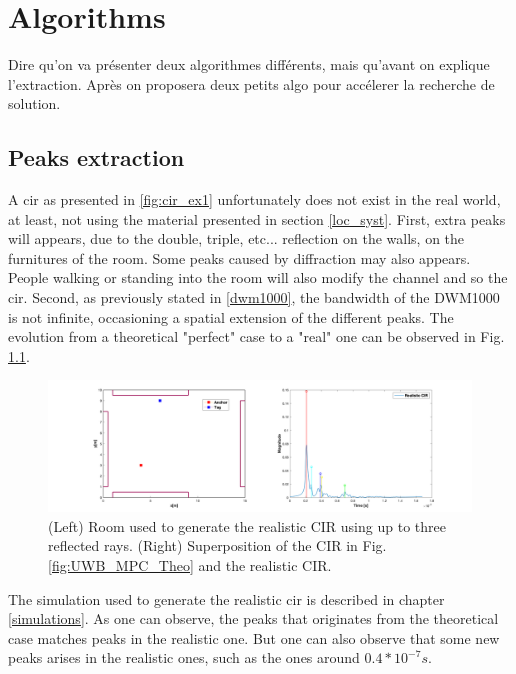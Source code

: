 \chapter{Algorithms}

Dire qu'on va présenter deux algorithmes différents, mais qu'avant on explique l'extraction. Après on proposera deux petits algo pour accélerer la recherche de solution.

\section{Peaks extraction}

A \gls{cir} as presented in \ref{fig:cir_ex1} unfortunately does not exist in the real world, at least, not using the material presented in section \ref{loc_syst}. First, extra peaks will appears, due to the double, triple, etc...  reflection on the walls, on the furnitures of the room. Some peaks caused by diffraction may also appears. People walking or standing into the room will also modify the channel and so the \gls{cir}. Second, as previously stated in \ref{dwm1000}, the bandwidth of the DWM1000 is not infinite, occasioning a spatial extension of the different peaks. The evolution from a theoretical "perfect" case to a "real" one can be observed in Fig. \ref{fig:peaks_real}.

\begin{figure}[H]
\centering
\includegraphics[width=\linewidth]{Images/cir_theo_real.png}
\caption{(Left) Room used to generate the realistic CIR using up to three reflected rays. (Right) Superposition of the CIR in Fig. \ref{fig:UWB_MPC_Theo} and the realistic CIR.\label{fig:peaks_real}}
\end{figure}

The simulation used to generate the realistic \gls{cir} is described in chapter \ref{simulations}. As one can observe, the peaks that originates from the theoretical case matches peaks in the realistic one. But one can also observe that some new peaks arises in the realistic ones, such as the ones around $0.4*10^{-7}s$. 
\vspace{2mm}


